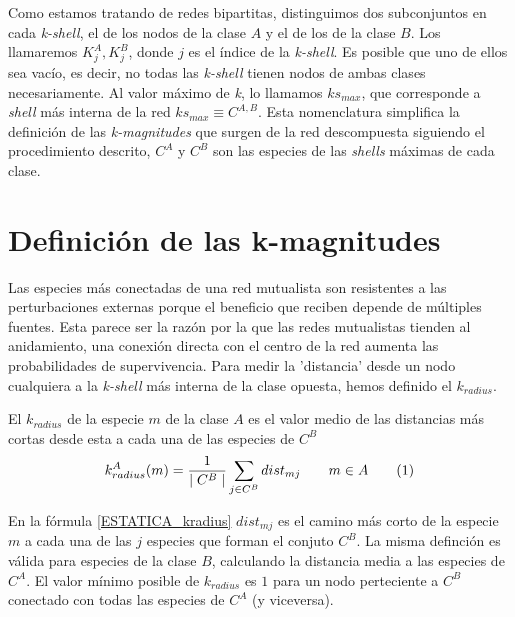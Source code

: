 Como estamos tratando de redes bipartitas, distinguimos dos subconjuntos en cada \textit{k-shell}, el de los nodos de la clase $A$ y el de los de la clase $B$. Los llamaremos $K^{A}_{j}, K^{B}_{j}$, donde  $j$ es el índice de la \textit{k-shell}.
Es posible que uno de ellos sea vacío, es decir, no todas las \textit{k-shell} tienen nodos de ambas clases necesariamente.
Al valor máximo de \textit{k}, lo llamamos $ks_{max}$, que corresponde a \textit{shell} más interna de la red $ks_{max}\equiv C^{A,B}$. Esta nomenclatura simplifica la definición de las \textit{k-magnitudes} que surgen de la red descompuesta siguiendo el procedimiento descrito, $C^A$ y $C^B$ son las especies de las \textit{shells} máximas de cada clase.


\section{Definición de las k-magnitudes}
\label{sec:ESTATICA_defkmagnitudes}

Las especies más conectadas de una red mutualista son resistentes a las perturbaciones externas porque el beneficio que reciben depende de múltiples fuentes. Esta parece ser la razón por la que las redes mutualistas tienden al anidamiento, una conexión directa con el centro de la red aumenta las probabilidades de supervivencia. Para medir la 'distancia' desde un nodo cualquiera a la \textit{k-shell} más interna de la clase opuesta, hemos definido el \textit{$k_{radius}$}.

\begin{theo} 
El \textit{$k_{radius}$} de la especie $m$ de la clase $A$ es el valor medio de las distancias más cortas desde esta a cada una de las especies de $C^B$
\begin{align*}
\displaystyle
k^A_{radius}(m) = \frac{1}{\mid C^{B} \mid}\sum\limits_{j \in C^{B}} dist_{mj}  \qquad   m \in A
\stepcounter{equation}\tag{\theequation}\label{ESTATICA_kradius}
\end{align*}
\end{theo}

En la fórmula \ref{ESTATICA_kradius} $dist_{mj}$ es el camino más corto de la especie $m$ a cada una de las $j$ especies que forman el conjuto $C^B$. La misma definción es válida para especies de la clase $B$, calculando la distancia media a las especies de $C^A$. El valor mínimo posible de $k_{radius}$ es $1$ para un nodo perteciente a $C^B$ conectado con todas las especies de $C^A$ (y viceversa).



